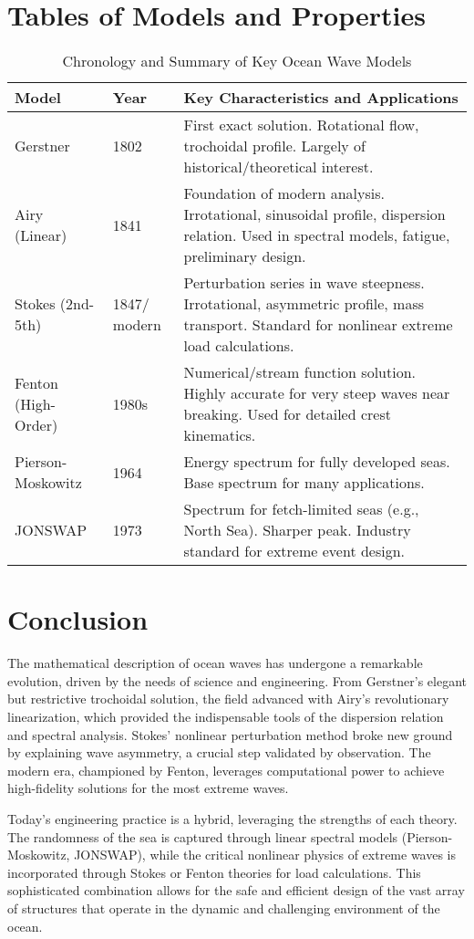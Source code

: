\documentclass[11pt,a4paper]{article}
\begin{document}
\section{Tables of Models and Properties}
\begin{table}[H]
\centering
\caption{Chronology and Summary of Key Ocean Wave Models}
\begin{tabular}{@{}llL{6cm}@{}}
\toprule
Model & Year & Key Characteristics and Applications \\
\midrule
Gerstner & 1802 & First exact solution. Rotational flow, trochoidal profile. Largely of historical/theoretical interest. \\
Airy (Linear) & 1841 & Foundation of modern analysis. Irrotational, sinusoidal profile, dispersion relation. Used in spectral models, fatigue, preliminary design. \\
Stokes (2nd-5th) & 1847/ modern & Perturbation series in wave steepness. Irrotational, asymmetric profile, mass transport. Standard for nonlinear extreme load calculations. \\
Fenton (High-Order) & 1980s & Numerical/stream function solution. Highly accurate for very steep waves near breaking. Used for detailed crest kinematics. \\
Pierson-Moskowitz & 1964 & Energy spectrum for fully developed seas. Base spectrum for many applications. \\
JONSWAP & 1973 & Spectrum for fetch-limited seas (e.g., North Sea). Sharper peak. Industry standard for extreme event design. \\
\bottomrule
\end{tabular}
\end{table}

\section{Conclusion}
The mathematical description of ocean waves has undergone a remarkable evolution, driven by the needs of science and engineering. From Gerstner's elegant but restrictive trochoidal solution, the field advanced with Airy's revolutionary linearization, which provided the indispensable tools of the dispersion relation and spectral analysis. Stokes' nonlinear perturbation method broke new ground by explaining wave asymmetry, a crucial step validated by observation. The modern era, championed by Fenton, leverages computational power to achieve high-fidelity solutions for the most extreme waves.

Today's engineering practice is a hybrid, leveraging the strengths of each theory. The randomness of the sea is captured through linear spectral models (Pierson-Moskowitz, JONSWAP), while the critical nonlinear physics of extreme waves is incorporated through Stokes or Fenton theories for load calculations. This sophisticated combination allows for the safe and efficient design of the vast array of structures that operate in the dynamic and challenging environment of the ocean.
\end{document}

